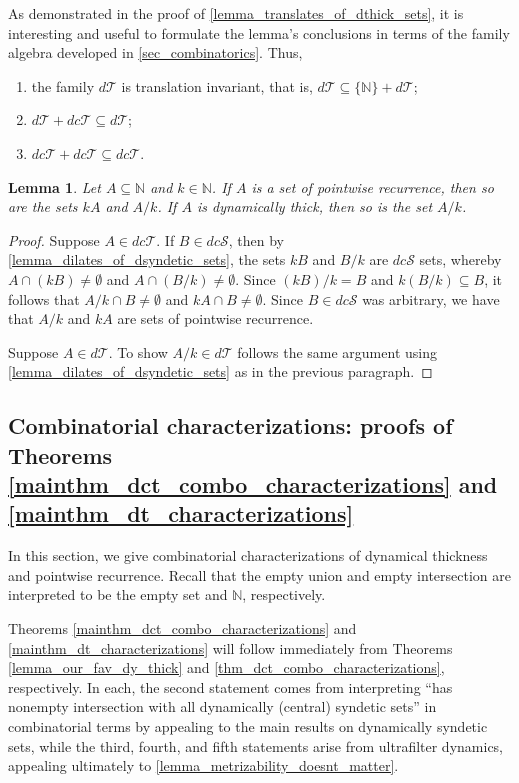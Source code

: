 \documentclass[letter,11pt]{article}
\theoremstyle{plain}
\newtheorem{lemma}[theorem]{Lemma}
\theoremstyle{definition}
\theoremstyle{plain}
\theoremstyle{plain}
\numberwithin{equation}{section}
\newcommand{\N}{\mathbb{N}}
\newcommand{\dthick}{d\mathcal{T}}
\newcommand{\dcsyndetic}{dc\mathcal{S}}
\newcommand{\dcthick}{dc\mathcal{T}}
\begin{document}
As demonstrated in the proof of \cref{lemma_translates_of_dthick_sets}, it is interesting and useful to formulate the lemma's conclusions in terms of the family algebra developed in \cref{sec_combinatorics}. Thus,
\begin{enumerate}
    \item the family $\dthick$ is translation invariant, that is, $\dthick \subseteq \{\N\} + \dthick$;
    \item $\dthick + \dcthick \subseteq \dthick$;
    \item $\dcthick + \dcthick \subseteq \dcthick$.
\end{enumerate}

\begin{lemma}\label{lem:dilates_of_dT_dcT}
    Let $A \subseteq \N$ and $k \in \N$. If $A$ is a set of pointwise recurrence, then so are the sets $kA$ and $A/k$.  If $A$ is dynamically thick, then so is the set $A/k$.
\end{lemma}

\begin{proof}
    Suppose $A \in \dcthick$.  If $B \in \dcsyndetic$, then by \cref{lemma_dilates_of_dsyndetic_sets}, the sets $kB$ and $B/k$ are $\dcsyndetic$ sets, whereby $A \cap (kB) \neq \emptyset$ and $A \cap (B/k) \neq \emptyset$.  Since $(kB)/k = B$ and $k(B/k) \subseteq B$, it follows that $A/k \cap B \neq \emptyset$ and $kA \cap B \neq \emptyset$. Since $B \in \dcsyndetic$ was arbitrary, we have that $A/k$ and $kA$ are sets of pointwise recurrence.

    Suppose $A \in \dthick$. To show $A/k \in \dthick$ follows the same argument using \cref{lemma_dilates_of_dsyndetic_sets} as in the previous paragraph.
\end{proof}

\subsection{Combinatorial characterizations: proofs of Theorems \ref{mainthm_dct_combo_characterizations} and \ref{mainthm_dt_characterizations}}
\label{sec_dthick_comb_characterizations}

In this section, we give combinatorial characterizations of dynamical thickness and pointwise recurrence.  Recall that the empty union and empty intersection are interpreted to be the empty set and $\N$, respectively.

Theorems \ref{mainthm_dct_combo_characterizations} and \ref{mainthm_dt_characterizations} will follow immediately from Theorems \ref{lemma_our_fav_dy_thick} and \ref{thm_dct_combo_characterizations}, respectively.  In each, the second statement comes from interpreting ``has nonempty intersection with all dynamically (central) syndetic sets'' in combinatorial terms by appealing to the main results on dynamically syndetic sets, while the third, fourth, and fifth statements arise from ultrafilter dynamics, appealing ultimately to \cref{lemma_metrizability_doesnt_matter}.
\end{document}
